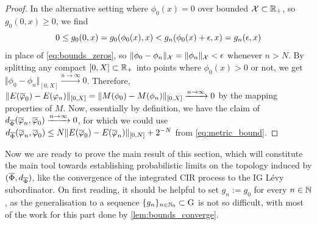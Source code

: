 \begin{proof}
    In the alternative setting where $\phi_0(x)=0$ over bounded $\mathcal{X}\subset\mathbb{R}_+$, so $g_0(0,x)\ge0$, we find
    \begin{equation}
        0\le g_0(0,x) = g_0(\phi_0(x),x) < g_n(\phi_0(x)+\epsilon,x) = g_n(\epsilon,x)
    \end{equation}
    in place of \autoref{eq:bounds_zeros}, so $\Vert\phi_0-\phi_n\Vert_{\mathcal{X}} = \Vert\phi_n\Vert_{\mathcal{X}}<\epsilon$ whenever $n>N$. By splitting any compact $[0,X]\subset\mathbb{R}_+$ into points where $\phi_0(x)>0$ or not, we get $\Vert\phi_0-\phi_n\Vert_{[0,X]}\xrightarrow{n\to\infty}0$. Therefore, $\Vert E(\overline{\varphi}_0)-E(\varphi_n)\Vert_{[0,X]} = \Vert M(\phi_0)-M(\phi_n)\Vert_{[0,X]}\xrightarrow{n\to\infty}0$ by the mapping properties of $M$. Now, essentially by definition, we have the claim of $d_{\overline{\Phi}}(\overline{\varphi}_n,\overline{\varphi}_0)\xrightarrow{n\to\infty}0$, for which we could use $d_{\overline{\Phi}}(\overline{\varphi}_n,\overline{\varphi}_0) \le N\Vert E(\overline{\varphi}_0) - E(\overline{\varphi}_n) \Vert_{[0,N]} + 2^{-N}$ from \autoref{eq:metric_bound}.
\end{proof}

Now we are ready to prove the main result of this section, which will constitute the main tool towards establishing probabilistic limits on the topology induced by $(\overline{\Phi},d_{\overline{\Phi}})$, like the convergence of the integrated CIR process to the IG L\'evy subordinator. On first reading, it should be helpful to set $g_n:=g_0$ for every $n\in\mathbb{N}$, as the generalisation to a sequence $\{g_n\}_{n\in\mathbb{N}_0}\subset\mathrm{G}$ is not so difficult, with most of the work for this part done by \autoref{lem:bounds_converge}.


